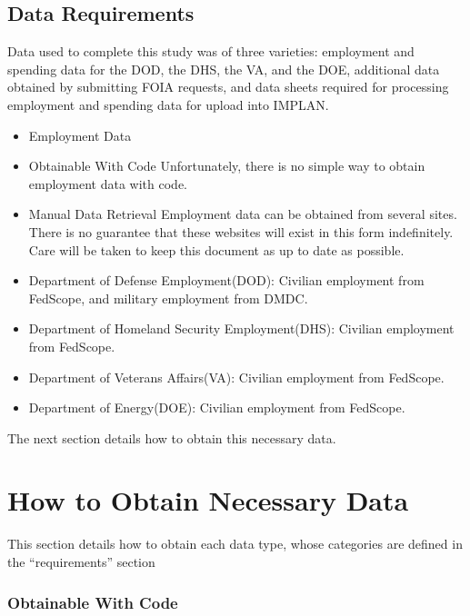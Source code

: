 \documentclass[
]{book}
\begin{document}
\hypertarget{data-requirements}{%
\section{Data Requirements}\label{data-requirements}}

Data used to complete this study was of three varieties: employment and spending data for the DOD, the DHS, the VA, and the DOE, additional data obtained by submitting FOIA requests, and data sheets required for processing employment and spending data for upload into IMPLAN.

\begin{itemize}
\item
  Employment Data
\item
  Obtainable With Code
  Unfortunately, there is no simple way to obtain employment data with code.
\item
  Manual Data Retrieval
  Employment data can be obtained from several sites. There is no guarantee that these websites will exist in this form indefinitely. Care will be taken to keep this document as up to date as possible.
\item
  Department of Defense Employment(DOD): Civilian employment from FedScope, and military employment from DMDC.
\item
  Department of Homeland Security Employment(DHS): Civilian employment from FedScope.
\item
  Department of Veterans Affairs(VA): Civilian employment from FedScope.
\item
  Department of Energy(DOE): Civilian employment from FedScope.
\end{itemize}

The next section details how to obtain this necessary data.

\hypertarget{how-to-obtain-necessary-data}{%
\chapter{How to Obtain Necessary Data}\label{how-to-obtain-necessary-data}}

This section details how to obtain each data type, whose categories are defined in the ``requirements'' section

\hypertarget{obtainable-with-code}{%
\subsection{Obtainable With Code}\label{obtainable-with-code}}
\end{document}
